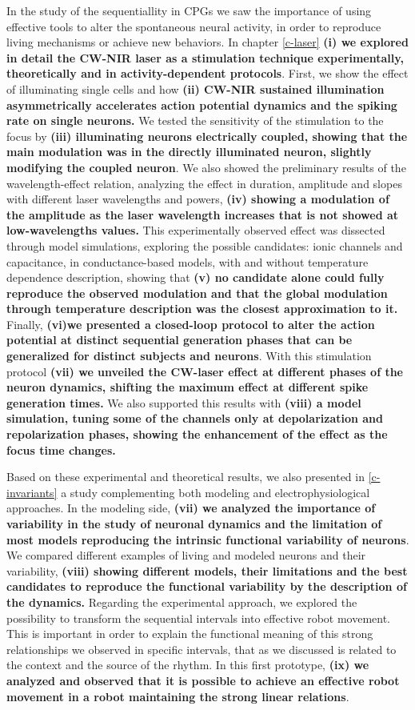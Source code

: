 In the study of the sequentiallity in CPGs we saw the importance of using effective tools to alter the spontaneous neural activity, in order to reproduce living mechanisms or achieve new behaviors. In chapter \ref{c-laser} \textbf{(i) we explored in detail the CW-NIR laser as a stimulation technique experimentally, theoretically and in activity-dependent protocols}. First, we show the effect of illuminating single cells and how \textbf{(ii) CW-NIR sustained illumination asymmetrically accelerates action potential dynamics and the spiking rate on single neurons.} We tested the sensitivity of the stimulation to the focus by \textbf{(iii) illuminating neurons electrically coupled, showing that the main modulation was in the directly illuminated neuron, slightly modifying the coupled neuron}. We also showed the preliminary results of the wavelength-effect relation, analyzing the effect in duration, amplitude and slopes with different laser wavelengths and powers, \textbf{(iv) showing a modulation of the amplitude as the laser wavelength increases that is not showed at low-wavelengths values.} This experimentally observed effect was dissected through model simulations, exploring the possible candidates: ionic channels and capacitance, in conductance-based models, with and without temperature dependence description, showing that \textbf{(v) no candidate alone could fully reproduce the observed modulation and that the global modulation through temperature description was the closest approximation to it.} Finally, \textbf{(vi)we presented a closed-loop protocol to alter the action potential at distinct sequential generation phases that can be generalized for distinct subjects and neurons}. With this stimulation protocol \textbf{(vii) we unveiled the CW-laser effect at different phases of the neuron dynamics, shifting the maximum effect at different spike generation times.} We also supported this results with \textbf{(viii) a model simulation, tuning some of the channels only at depolarization and repolarization phases, showing the enhancement of the effect as the focus time changes.}


Based on these experimental and theoretical results, we also presented in \ref{c-invariants} a study complementing both modeling and electrophysiological approaches. In the modeling side, \textbf{(vii) we analyzed the importance of variability in the study of neuronal dynamics and the limitation of most models reproducing the intrinsic functional variability of neurons}. We compared different examples of living and modeled neurons and their variability, \textbf{(viii) showing different models, their limitations and the best candidates to reproduce the functional variability by the description of the dynamics.} Regarding the experimental approach, we explored the possibility to transform the sequential intervals into effective robot movement. This is important in order to explain the functional meaning of this strong relationships we observed in specific intervals, that as we discussed is related to the context and the source of the rhythm. In this first prototype, \textbf{(ix) we analyzed and observed that it is possible to achieve an effective robot movement in a robot maintaining the strong linear relations}.

